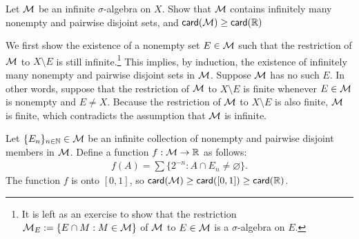\begin{prob}[Exercise 1.3]
    Let ${\mathcal{M}}$ be an infinite $\sigma$-algebra on $X$.
    Show that ${\mathcal{M}}$ contains infinitely many nonempty and pairwise disjoint sets, and $\textsf{card}({{\mathcal{M}}})\geq\textsf{card}({{\mathbb{R}}})$
\end{prob}
\begin{sol}
    We first show the existence of a nonempty set $E\in{\mathcal{M}}$ such that the restriction of ${\mathcal{M}}$ to $X\setminus E$ is still infinite.\footnote{It is left as an exercise to show that the restriction ${\mathcal{M}}_E:=\{E\cap M:M\in{\mathcal{M}}\}$ of ${\mathcal{M}}$ to $E\in{\mathcal{M}}$ is a $\sigma$-algebra on $E$.}
    This implies, by induction, the existence of infinitely many nonempty and pairwise disjoint sets in ${\mathcal{M}}$.
    Suppose ${\mathcal{M}}$ has no such $E$.
    In other words, suppose that the restriction of ${\mathcal{M}}$ to $X\setminus E$ is finite whenever $E\in{\mathcal{M}}$ is nonempty and $E\neq X$.
    Because the restriction of ${\mathcal{M}}$ to $X\setminus E$ is also finite, ${\mathcal{M}}$ is finite, which contradicts the assumption that ${\mathcal{M}}$ is infinite.
    
    Let $\{E_n\}_{n\in{\mathbb{N}}}\in{\mathcal{M}}$ be an infinite collection of nonempty and pairwise disjoint members in ${\mathcal{M}}$.
    Define a function $f: {\mathcal{M}}\rightarrow{\mathbb{R}}$ as follows:
    \begin{align*}
        f(A)=\sum\{2^{-n}
        :
        A\cap E_n\neq\varnothing\}.
    \end{align*}
    The function $f$ is onto $[0, 1]$, so $\textsf{card}({{\mathcal{M}}})\geq\textsf{card}({[0, 1]})\geq\textsf{card}({{\mathbb{R}}})$.
\end{sol}
